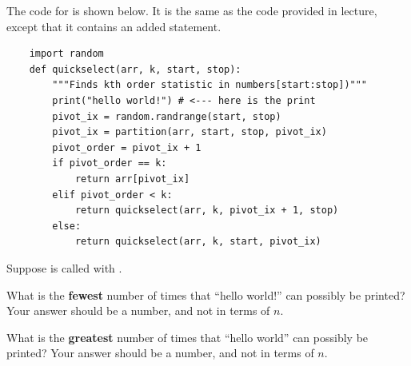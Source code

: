 \begin{prob}
    The code for  is shown below. It is the same
    as the code provided in lecture, except that it contains an added
     statement.

    \begin{verbatim}
    import random 
    def quickselect(arr, k, start, stop):
        """Finds kth order statistic in numbers[start:stop])"""
        print("hello world!") # <--- here is the print
        pivot_ix = random.randrange(start, stop)
        pivot_ix = partition(arr, start, stop, pivot_ix)
        pivot_order = pivot_ix + 1
        if pivot_order == k:
            return arr[pivot_ix]
        elif pivot_order < k:
            return quickselect(arr, k, pivot_ix + 1, stop)
        else:
            return quickselect(arr, k, start, pivot_ix)
    \end{verbatim}

    Suppose  is called with
    .

    What is the \textbf{fewest} number of times that ``hello world!'' can possibly be printed?
    Your answer should be a number, and not in terms of $n$.


    What is the \textbf{greatest} number of times that ``hello world'' can possibly be printed?
    Your answer should be a number, and not in terms of $n$.

\end{prob}

